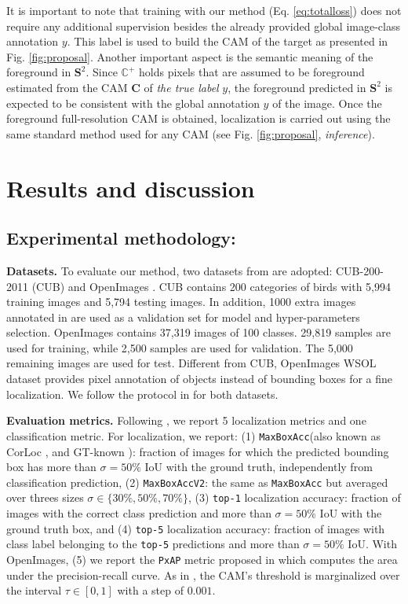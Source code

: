 \documentclass[twocolumn]{article}
\newcommand\maxboxacc{\texttt{MaxBoxAcc}\xspace}
\newcommand\newmaxboxacc{\texttt{MaxBoxAccV2}\xspace}
\newcommand\pxap{\texttt{PxAP}\xspace}
\newcommand\topone{\texttt{top-1}\xspace}
\newcommand\topfive{\texttt{top-5}\xspace}
\theoremstyle{definition}
\begin{document}
It is important to note that training with our method (Eq. \ref{eq:totalloss}) does not require any additional supervision besides the already provided global image-class annotation ${y}$. This label is used to build the CAM of the target as presented in Fig. \ref{fig:proposal}. Another important aspect is the semantic meaning of the foreground in ${\bm{S}^2}$. Since ${\mathbb{C}^+}$ holds pixels that are assumed to be foreground estimated from the CAM ${\bm{C}}$ of \emph{the true label} ${y}$, the foreground predicted in ${\bm{S}^2}$ is expected to be consistent with the global annotation $y$ of the image. Once the foreground full-resolution CAM is obtained, localization is carried out using the same standard method used for any CAM (see Fig. \ref{fig:proposal}, \emph{inference}).


\section{Results and discussion}
\label{sec:experiments}

\subsection{Experimental methodology:}
\label{subsec:expsettings}

\noindent \textbf{Datasets.} To evaluate our method, two datasets from \cite{choe2020evaluating} are adopted: CUB-200-2011 (CUB) \cite{WahCUB2002011} and OpenImages \cite{BenensonPF19,choe2020evaluating}. CUB contains 200 categories of birds with 5,994 training images and 5,794 testing images. In addition, 1000 extra images annotated in \cite{choe2020evaluating} are used as a validation set for model and hyper-parameters selection. OpenImages contains 37,319 images of 100 classes. 29,819 samples are used for training, while 2,500 samples are used for validation. The 5,000 remaining images are used for test. Different from CUB, OpenImages WSOL dataset provides pixel annotation of objects instead of bounding boxes for a fine localization. We follow the protocol in \cite{choe2020evaluating} for both datasets.

\noindent \textbf{Evaluation metrics.} Following \cite{choe2020evaluating}, we report 5 localization metrics and one classification metric. For localization, we report: (1) \maxboxacc (also known as CorLoc \cite{deselaers2012weakly}, and GT-known \cite{SinghL17}): fraction of images for which the predicted bounding box has more than $\sigma = 50\%$ IoU with the ground truth,  independently from classification prediction, (2) \newmaxboxacc: the same as \maxboxacc but averaged over threes sizes ${\sigma \in \{30\%, 50\%, 70\%\}}$, (3) \topone localization accuracy: fraction of images with the correct class prediction and more than ${\sigma = 50\%}$ IoU with the ground truth box, and (4) \topfive localization accuracy: fraction of images with class label belonging to the \topfive predictions and more than ${\sigma=50\%}$ IoU.  With OpenImages, (5) we report the \pxap metric proposed in \cite{choe2020evaluating} which computes the area under the precision-recall curve. As in \cite{choe2020evaluating}, the CAM's threshold is marginalized over the interval ${\tau \in [0, 1]}$ with a step of $0.001$.
\end{document}
